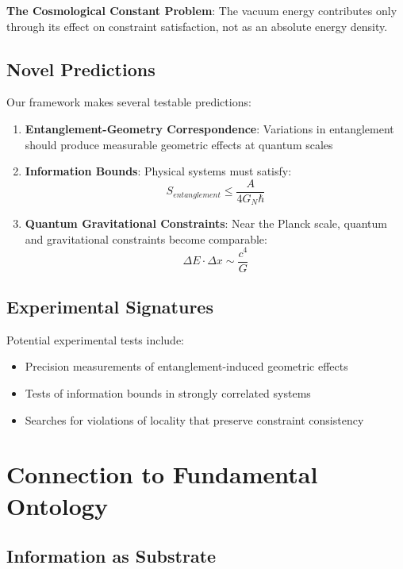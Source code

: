 \documentclass[12pt,a4paper]{article}
\begin{document}
\textbf{The Cosmological Constant Problem}: The vacuum energy contributes only through its effect on constraint satisfaction, not as an absolute energy density.

\subsection{Novel Predictions}

Our framework makes several testable predictions:

\begin{enumerate}
\item \textbf{Entanglement-Geometry Correspondence}: Variations in entanglement should produce measurable geometric effects at quantum scales
\item \textbf{Information Bounds}: Physical systems must satisfy:
\begin{equation}
S_{entanglement} \leq \frac{A}{4G_N\hbar}
\end{equation}
\item \textbf{Quantum Gravitational Constraints}: Near the Planck scale, quantum and gravitational constraints become comparable:
\begin{equation}
\Delta E \cdot \Delta x \sim \frac{c^4}{G}
\end{equation}
\end{enumerate}

\subsection{Experimental Signatures}

Potential experimental tests include:
\begin{itemize}
\item Precision measurements of entanglement-induced geometric effects
\item Tests of information bounds in strongly correlated systems
\item Searches for violations of locality that preserve constraint consistency
\end{itemize}

\section{Connection to Fundamental Ontology}

\subsection{Information as Substrate}
\end{document}
